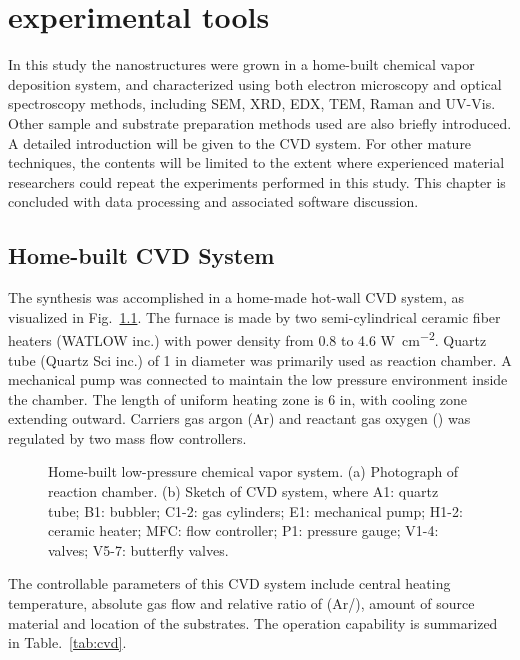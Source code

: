
\chapter{experimental tools}

In this study the nanostructures were grown in a home-built chemical vapor deposition system, and characterized using both electron microscopy and optical spectroscopy methods, including SEM, XRD, EDX, TEM, Raman and UV-Vis. Other sample and substrate preparation methods used are also briefly introduced. A detailed introduction will be given to the CVD system. For other mature techniques, the contents will be limited to the extent where experienced material researchers could repeat the experiments performed in this study. This chapter is concluded with data processing and associated software discussion. 


\section{Home-built CVD System}

The synthesis was accomplished in a home-made hot-wall CVD system, as visualized in Fig.~\ref{fig:ch2cvd}. The furnace is made by two semi-cylindrical ceramic fiber heaters (WATLOW inc.) with power density from 0.8 to 4.6 \si{W cm^{-2}}. Quartz tube (Quartz Sci inc.) of 1 in diameter was primarily used as reaction chamber. A mechanical pump was connected to maintain the low pressure environment inside the chamber. The length of uniform heating zone is 6 in, with cooling zone extending outward. Carriers gas argon (Ar) and reactant gas oxygen () was regulated by two mass flow controllers.

\begin{figure}[htb]
\centering
{}

\caption[CVD system]{Home-built low-pressure chemical vapor system. (a) Photograph of reaction chamber. (b) Sketch of CVD system, where A1: quartz tube; B1: bubbler; C1-2: gas cylinders; E1: mechanical pump; H1-2: ceramic heater; MFC: flow controller; P1: pressure gauge; V1-4: valves; V5-7: butterfly valves.}
\label{fig:ch2cvd}
\end{figure}

The controllable parameters of this CVD system include central heating temperature, absolute gas flow and relative ratio of (Ar/), amount of source material and location of the substrates. The operation capability is summarized in Table.~\ref{tab:cvd}.

